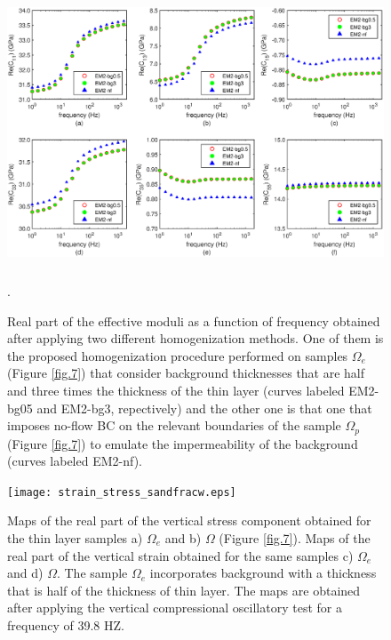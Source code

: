 \documentclass[draft]{agujournal2019}
\begin{document}
\begin{figure}[!ht]
\centering
        \includegraphics[width= 120mm, height=80mm]{cij_2sandfracw.eps}
\caption{Real part of the effective moduli as a function of frequency obtained after applying two different homogenization methods. One of them is the proposed homogenization procedure performed on samples $\Omega_e$ (Figure \ref{fig.7}) that consider background thicknesses that are half and three times the thickness of the thin layer (curves labeled EM2-bg05 and EM2-bg3, repectively) and the other one is that one that imposes no-flow BC on the relevant boundaries of the sample $\Omega_p$ (Figure \ref{fig.7}) to emulate the impermeability of the background (curves labeled EM2-nf). }. 

\label{fig.8}
\end{figure}

\begin{figure}[!ht]
\centering
        \texttt{[image: strain\_stress\_sandfracw.eps]}
\caption{Maps of the real part of the vertical  stress component   obtained for the thin layer samples a) $\Omega_e$  and b) $\Omega$ (Figure \ref{fig.7}). Maps of the real part of the vertical strain  obtained for the same samples c) $\Omega_e$  and d) $\Omega$. 
The sample $\Omega_e$ incorporates background with a thickness that is half of the thickness of thin layer.
The maps are obtained after applying the vertical compressional oscillatory test for a frequency of 39.8 HZ.}
\label{fig.9}
\end{figure}
\end{document}
